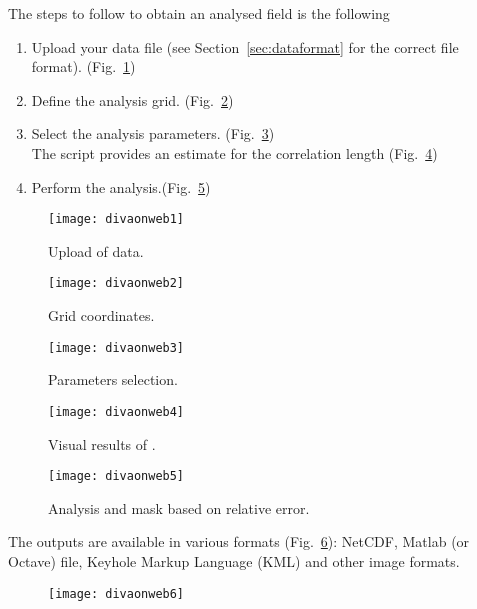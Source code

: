 The steps to follow to obtain an analysed field is the following

\begin{enumerate}
\item Upload your data file (see Section~\ref{sec:dataformat} for the correct file format). \hfill (Fig.~\ref{fig:divaonweb1})
\item Define the analysis grid. \hfill (Fig.~\ref{fig:divaonweb2})
\item Select the analysis parameters. \hfill (Fig.~\ref{fig:divaonweb3})\\
The script  provides an estimate for the correlation length \hfill (Fig.~\ref{fig:divaonweb4})
\item Perform the analysis.\hfill (Fig.~\ref{fig:divaonweb5})
\end{enumerate}

\begin{figure}[H]
\centering 
\texttt{[image: divaonweb1]}
\caption{Upload of data.\label{fig:divaonweb1}}
\end{figure}

\begin{figure}[H]
\centering 
\texttt{[image: divaonweb2]}
\caption{Grid coordinates.\label{fig:divaonweb2}}
\end{figure}

\begin{figure}[H]
\centering 
\texttt{[image: divaonweb3]}
\caption{Parameters selection.\label{fig:divaonweb3}}
\end{figure}

\begin{figure}[H]
\centering 
\texttt{[image: divaonweb4]}
\caption{Visual results of .\label{fig:divaonweb4}}
\end{figure}

\begin{figure}[H]
\centering 
\texttt{[image: divaonweb5]}
\caption{Analysis and mask based on relative error.\label{fig:divaonweb5}}
\end{figure}

The outputs are available in various formats (Fig.~\ref{fig:divaonweb6}): NetCDF, Matlab (or Octave) file, Keyhole Markup Language (KML) and other image formats. 

\begin{figure}[H]
\centering 
\texttt{[image: divaonweb6]}
\caption{\label{fig:divaonweb6}}
\end{figure}

